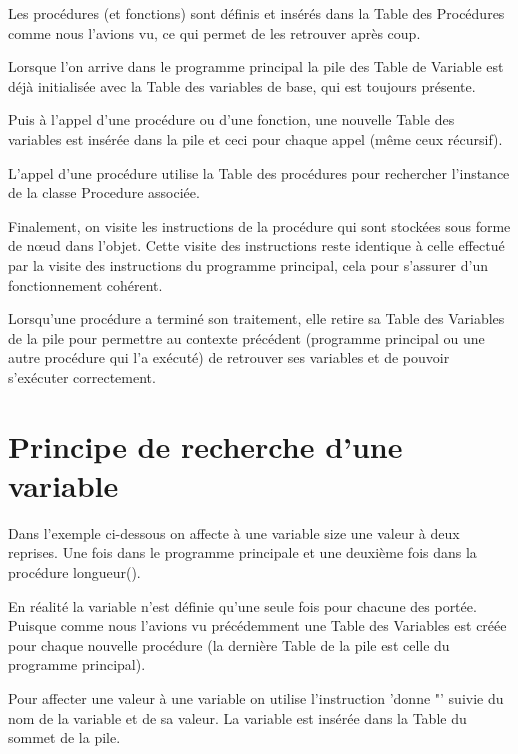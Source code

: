 \documentclass[a4paper,11pt]{article}
\begin{document}
Les procédures (et fonctions) sont définis et insérés dans la Table des Procédures comme nous l'avions vu, ce qui permet de les retrouver après coup.

Lorsque l'on arrive dans le programme principal la pile des Table de Variable est déjà initialisée avec la Table des variables de base, qui est toujours présente.

Puis à l'appel d'une procédure ou d'une fonction, une nouvelle Table des variables est insérée dans la pile et ceci pour chaque appel (même ceux récursif).

L'appel d'une procédure utilise la Table des procédures pour rechercher l'instance de la classe Procedure associée.

Finalement, on visite les instructions de la procédure qui sont stockées sous forme de nœud dans l'objet. Cette visite des instructions reste identique à celle effectué par la visite des instructions du programme principal, cela pour s'assurer d'un fonctionnement cohérent.

Lorsqu'une procédure a terminé son traitement, elle retire sa Table des Variables de la pile pour permettre au contexte précédent (programme principal ou une autre procédure qui l'a exécuté) de retrouver ses variables et de pouvoir s'exécuter correctement.





\section{Principe de recherche d'une variable}
Dans l'exemple ci-dessous on affecte à une variable size une valeur à deux reprises. Une fois dans le programme principale et une deuxième fois dans la procédure longueur().

En réalité la variable n'est définie qu'une seule fois pour chacune des portée. Puisque comme nous l'avions vu précédemment une Table des Variables est créée pour chaque nouvelle procédure (la dernière Table de la pile est celle du programme principal).

Pour affecter une valeur à une variable on utilise l'instruction 'donne "' suivie du nom de la variable et de sa valeur. La variable est insérée dans la Table du sommet de la pile.
\end{document}
